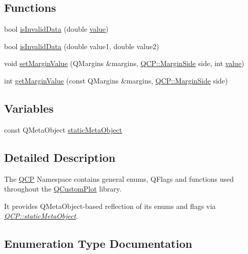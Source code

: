 \subsection*{Functions}
\begin{DoxyCompactItemize}
\item 
bool \mbox{\hyperlink{namespace_q_c_p_a07ab701c05329089f933b9cae2638a63}{is\+Invalid\+Data}} (double \mbox{\hyperlink{diffusion_8cpp_a4b41795815d9f3d03abfc739e666d5da}{value}})
\item 
bool \mbox{\hyperlink{namespace_q_c_p_a728903e5c3dd17847bee280f4005496f}{is\+Invalid\+Data}} (double value1, double value2)
\item 
void \mbox{\hyperlink{namespace_q_c_p_afbf6e3084c108f2bb4372107945ee82f}{set\+Margin\+Value}} (Q\+Margins \&margins, \mbox{\hyperlink{namespace_q_c_p_a7e487e3e2ccb62ab7771065bab7cae54}{Q\+C\+P\+::\+Margin\+Side}} side, int \mbox{\hyperlink{diffusion_8cpp_a4b41795815d9f3d03abfc739e666d5da}{value}})
\item 
int \mbox{\hyperlink{namespace_q_c_p_a23a2679d3495c444acc26acc61e35b5b}{get\+Margin\+Value}} (const Q\+Margins \&margins, \mbox{\hyperlink{namespace_q_c_p_a7e487e3e2ccb62ab7771065bab7cae54}{Q\+C\+P\+::\+Margin\+Side}} side)
\end{DoxyCompactItemize}
\subsection*{Variables}
\begin{DoxyCompactItemize}
\item 
const Q\+Meta\+Object \mbox{\hyperlink{namespace_q_c_p_a07ffa1eb1537a3b1f218ff2a442b2017}{static\+Meta\+Object}}
\end{DoxyCompactItemize}


\subsection{Detailed Description}
The \mbox{\hyperlink{namespace_q_c_p}{Q\+CP}} Namespace contains general enums, Q\+Flags and functions used throughout the \mbox{\hyperlink{class_q_custom_plot}{Q\+Custom\+Plot}} library.

It provides Q\+Meta\+Object-\/based reflection of its enums and flags via {\itshape \mbox{\hyperlink{namespace_q_c_p_a07ffa1eb1537a3b1f218ff2a442b2017}{Q\+C\+P\+::static\+Meta\+Object}}}. 

\subsection{Enumeration Type Documentation}
\mbox{\label{namespace_q_c_p_ae55dbe315d41fe80f29ba88100843a0c}} 
